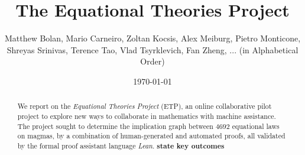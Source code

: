 \documentclass[12pt]{article}
\title{The Equational Theories Project}
\author{Matthew Bolan, Mario Carneiro, Zoltan Kocsis, Alex Meiburg, Pietro Monticone, Shreyas Srinivas, Terence Tao, Vlad Tsyrklevich, Fan Zheng, ... (in Alphabetical Order)}
\date{\today}
\theoremstyle{definition}
\newcommand{\note}[1]{{\bf #1}}
\begin{document}
\begin{abstract}
  We report on the \emph{Equational Theories Project} (ETP), an online collaborative pilot project
  to explore new ways to collaborate in mathematics with machine assistance. The project sought to
  determine the implication graph between $4692$ equational laws on magmas, by a combination of
  human-generated and automated proofs, all validated by the formal proof assistant language
  \emph{Lean}. \note{state key outcomes}
\end{abstract}

\maketitle

\tableofcontents

















\appendix







\end{document}
